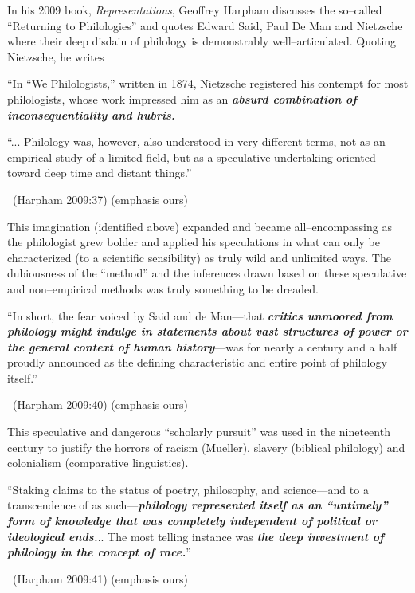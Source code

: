 In his 2009 book, \textit{Representations}, Geoffrey Harpham discusses the so–called “Returning to Philologies” and quotes Edward Said, Paul De Man and Nietzsche where their deep disdain of philology is demonstrably well–articulated. Quoting Nietzsche, he writes

“In “We Philologists,” written in 1874, Nietzsche registered his contempt for most philologists, whose work impressed him as an \textbf{\textit{absurd combination of inconsequentiality and hubris.}}

\begin{myquote}
“... Philology was, however, also understood in very different terms, not as an empirical study of a limited field, but as a speculative undertaking oriented toward deep time and distant things.”

~\hfill (Harpham 2009:37) (emphasis ours)
\end{myquote}

This imagination (identified above) expanded and became all–encompassing as the philologist grew bolder and applied his speculations in what can only be characterized (to a scientific sensibility) as truly wild and unlimited ways. The dubiousness of the “method” and the inferences drawn based on these speculative and non–empirical methods was truly something to be dreaded.

\begin{myquote}
“In short, the fear voiced by Said and de Man—that \textbf{\textit{critics unmoored from philology might indulge in statements about vast structures of power or the general context of human history}}—was for nearly a century and a half proudly announced as the defining characteristic and entire point of philology itself.”

~\hfill (Harpham 2009:40) (emphasis ours)
\end{myquote}

This speculative and dangerous “scholarly pursuit” was used in the nineteenth century to justify the horrors of racism (Mueller), slavery (biblical philology) and colonialism (comparative linguistics).

\begin{myquote}
“Staking claims to the status of poetry, philosophy, and science—and to a transcendence of as such—\textbf{\textit{philology represented itself as an “untimely” form of knowledge that was completely independent of political or ideological ends.}}.. The most telling instance was \textbf{\textit{the deep investment of philology in the concept of race.}}”

~\hfill (Harpham 2009:41) (emphasis ours)
\end{myquote}

